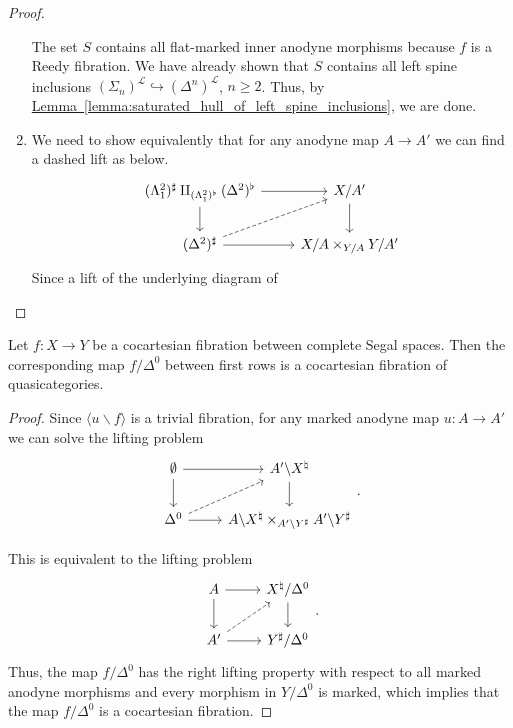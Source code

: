 \documentclass[main.tex]{subfiles}
\begin{document}
\begin{proof}
\begin{enumerate}
    The set $S$ contains all flat-marked inner anodyne morphisms because $f$ is a Reedy fibration. We have already shown that $S$ contains all left spine inclusions $(\Sigma_{n})^{\mathcal{L}} \hookrightarrow (\Delta^{n})^{\mathcal{L}}$, $n \geq 2$. Thus, by \hyperref[lemma:saturated_hull_of_left_spine_inclusions]{Lemma~\ref*{lemma:saturated_hull_of_left_spine_inclusions}}, we are done.

  \item We need to show equivalently that for any anodyne map $A \to A'$ we can find a dashed lift as below.
    \begin{equation*}
      \begin{tikzcd}
        (\Lambda^{2}_{1})^{\sharp} \amalg_{(\Lambda^{2}_{1})^{\flat}} (\Delta^{2})^{\flat}
        \arrow[r]
        \arrow[d]
        & X / A'
        \arrow[d]
        \\
        (\Delta^{2})^{\sharp}
        \arrow[r]
        \arrow[ur, dashed]
        & X / A \times_{Y / A} Y / A'
      \end{tikzcd}
    \end{equation*}
    Since a lift of the underlying diagram of
  \end{enumerate}
\end{proof}

\begin{corollary}
  Let $f\colon X \to Y$ be a cocartesian fibration between complete Segal spaces. Then the corresponding map $f / \Delta^{0}$ between first rows is a cocartesian fibration of quasicategories.
\end{corollary}
\begin{proof}
  Since $\langle u \backslash f \rangle$ is a trivial fibration, for any marked anodyne map $u\colon A \to A'$ we can solve the lifting problem
  \begin{equation*}
    \begin{tikzcd}
      \emptyset
      \arrow[r]
      \arrow[d]
      & A' \backslash X^{\natural}
      \arrow[d]
      \\
      \Delta^{0}
      \arrow[r]
      \arrow[ur, dashed]
      & A \backslash X^{\natural} \times_{A' \backslash Y^{\sharp}} A' \backslash Y^{\sharp}
    \end{tikzcd}.
  \end{equation*}

  This is equivalent to the lifting problem
  \begin{equation*}
    \begin{tikzcd}
      A
      \arrow[r]
      \arrow[d]
      & X^{\natural} / \Delta^{0}
      \arrow[d]
      \\
      A'
      \arrow[r]
      \arrow[ur, dashed]
      & Y^{\sharp} / \Delta^{0}
    \end{tikzcd}.
  \end{equation*}
  Thus, the map $f / \Delta^{0}$ has the right lifting property with respect to all marked anodyne morphisms and every morphism in $Y / \Delta^{0}$ is marked, which implies that the map $f / \Delta^{0}$ is a cocartesian fibration.
\end{proof}
\end{document}
